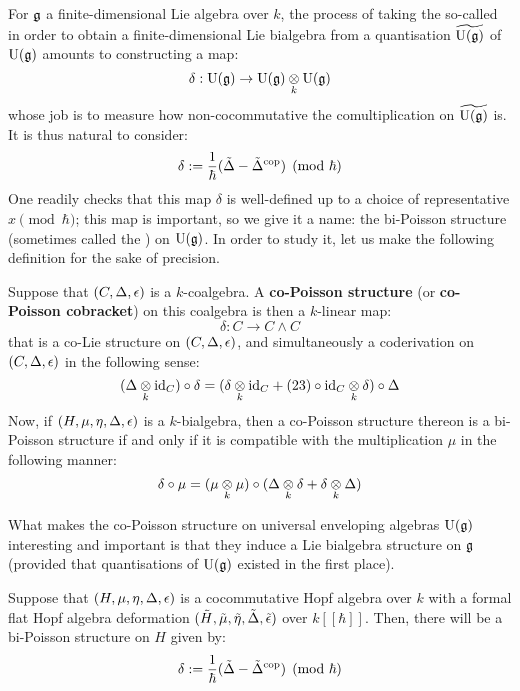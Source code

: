         For $\mathfrak{g}$ a finite-dimensional Lie algebra over $k$, the process of taking the so-called  in order to obtain a finite-dimensional Lie bialgebra from a quantisation $\widetilde{\mathrm{U}(\mathfrak{g})}$ of $\mathrm{U}(\mathfrak{g})$ amounts to constructing a  map:
            $$\delta: \rmU(\g) \to \rmU(\g) \tensor_k \rmU(\g)$$
        whose job is to measure how non-cocommutative the comultiplication on $\widetilde{\mathrm{U}(\mathfrak{g})}$ is. It is thus natural to consider:
            $$\delta := \frac1\hbar(\tilde{\Delta} - \tilde{\Delta}^{\mathrm{cop}}) \pmod{\hbar}$$
        One readily checks that this map $\delta$ is well-defined up to a choice of representative $x \pmod{\hbar}$; this map is important, so we give it a name: the bi-Poisson structure (sometimes called the ) on $\mathrm{U}(\mathfrak{g})$. In order to study it, let us make the following definition for the sake of precision.
        \begin{definition} \label{def: co/bi_poisson_structures}
            Suppose that $(C, \Delta, \epsilon)$ is a $k$-coalgebra. A \textbf{co-Poisson structure} (or \textbf{co-Poisson cobracket}) on this coalgebra is then a $k$-linear map:
                $$\delta: C \to C \wedge C$$
            that is a co-Lie structure on $(C, \Delta, \epsilon)$, and simultaneously a coderivation on $(C, \Delta, \epsilon)$ in the following sense:
                $$(\Delta \tensor_k \id_C) \circ \delta = (\delta \tensor_k \id_C + (23) \circ \id_C \tensor_k \delta) \circ \Delta$$
            Now, if $(H, \mu, \eta, \Delta, \epsilon)$ is a $k$-bialgebra, then a co-Poisson structure thereon is a bi-Poisson structure if and only if it is compatible with the multiplication $\mu$ in the following manner:
                $$\delta \circ \mu = (\mu \tensor_k \mu) \circ (\Delta \tensor_k \delta + \delta \tensor_k \Delta)$$
        \end{definition}
        What makes the co-Poisson structure on universal enveloping algebras $\mathrm{U}(\mathfrak{g})$ interesting and important is that they induce a Lie bialgebra structure on $\mathfrak{g}$ (provided that quantisations of $\mathrm{U}(\mathfrak{g})$ existed in the first place). 
        \begin{lemma} \label{lemma: bi_poisson_structures_from_hopf_algebra_deformations}
            Suppose that $(H, \mu, \eta, \Delta, \epsilon)$ is a cocommutative Hopf algebra over $k$ with a formal flat Hopf algebra deformation $(\tilde{H}, \tilde{\mu}, \tilde{\eta}, \tilde{\Delta}, \tilde{\epsilon})$ over $k[\![\hbar]\!]$. Then, there will be a bi-Poisson structure on $H$ given by:
                $$\delta := \frac{1}{\hbar}(\tilde{\Delta} - \tilde{\Delta}^{\mathrm{cop}}) \pmod{\hbar}$$
        \end{lemma}
